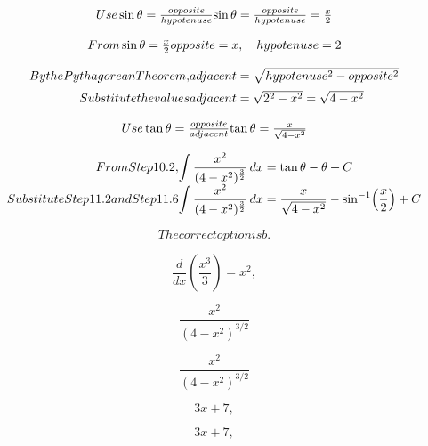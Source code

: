 \documentclass{article}
\begin{document}
\[
\begin{array}{@{}r@{}l@{}}
 Use \sin\theta=\frac{ opposite }{ hypotenuse } &
 \sin\theta=\frac{ opposite }{ hypotenuse }=\frac{x}{2}
 \end{array}
\]

\[
\begin{array}{@{}r@{}l@{}}
 From \sin\theta=\frac{x}{2}
 &
 opposite = x ,\quad hypotenuse = 2 \end{array}
\]

\[
\begin{array}{@{}r@{}l@{}}
 By the Pythagorean Theorem , &
 adjacent =\sqrt{ hypotenuse ^2- opposite ^2}
 \\[1.2ex]
 Substitute the values &
 adjacent =\sqrt{2^2-x^2}= \sqrt{4-x^2} \end{array}
\]

\[
\begin{array}{@{}r@{}l@{}}
 Use \tan\theta=\frac{ opposite }{ adjacent }
 &
 \tan\theta=\frac{ x }{ \sqrt{4-x^2} }
 \end{array}
\]

\[
\begin{array}{@{}r@{}l@{}}
 From Step 10.2 , &
 \displaystyle\int \frac{x^2}{(4-x^2)^{\frac{3}{2}}}\,dx
 =
 \tan\theta-\theta+C
 \\[1.2ex]
 Substitute Step 11.2 and Step 11.6 &
 \displaystyle\int \frac{x^2}{(4-x^2)^{\frac{3}{2}}}\,dx
 =
 \frac{x}{\sqrt{4-x^2}} -
 \sin^{-1}\!\left(\frac{x}{2}\right) + C
 \end{array}
\]

\[
The correct option is b .
\]

\[
\frac{d}{dx}\left(\frac{x^3}{3}\right)=x^2,
\]

\[
\frac{x^2}{(4-x^2)^{3/2}}
\]

\[
\frac{x^2}{(4-x^2)^{3/2}}
\]

\[
3x+7,
\]

\[
3x+7,
\]
\end{document}
